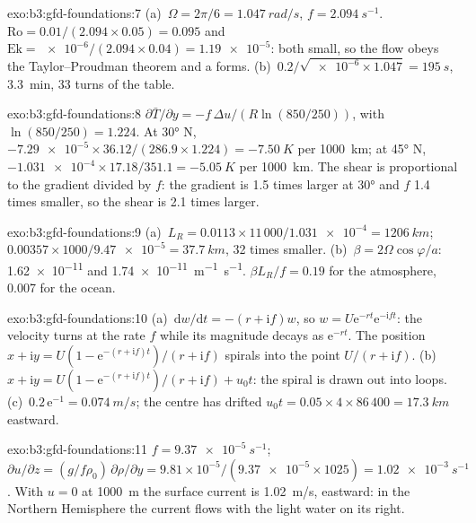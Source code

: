\begin{solution}{exo:b3:gfd-foundations:7}
(a)~$\Omega = 2\pi/6 = \qty{1.047}{rad/s}$, $f = \qty{2.094}{s^{-1}}$.
$\mathrm{Ro} = 0.01/(2.094\times0.05) = 0.095$ and $\mathrm{Ek} =
\num{e-6}/(2.094\times0.04) = \num{1.19e-5}$: both small, so the flow obeys
the Taylor--Proudman theorem and a  forms. (b)~$0.2/\sqrt{\num{e-6}
\times1.047} = \qty{195}{s}$, \qty{3.3}{min}, 33 turns of the table.
\end{solution}

\begin{solution}{exo:b3:gfd-foundations:8}
$\partial\bar T/\partial y = -f\,\Delta u/(R\ln(850/250))$, with
$\ln(850/250) = 1.224$. At \ang{30} N, $-\num{7.29e-5}\times36.12/(286.9
\times1.224) = \qty{-7.50}{K}$ per \qty{1000}{km}; at \ang{45} N,
$-\num{1.031e-4}\times17.18/351.1 = \qty{-5.05}{K}$ per \qty{1000}{km}. The
shear is proportional to the gradient divided by $f$: the gradient is 1.5
times larger at \ang{30} and $f$ 1.4 times smaller, so the shear is 2.1 times
larger.
\end{solution}

\begin{solution}{exo:b3:gfd-foundations:9}
(a)~$L_R = 0.0113\times11\,000/\num{1.031e-4} = \qty{1206}{km}$;
$0.00357\times1000/\num{9.47e-5} = \qty{37.7}{km}$, 32 times smaller.
(b)~$\beta = 2\Omega\cos\varphi/a$: \num{1.62e-11} and
\qty{1.74e-11}{m^{-1}.s^{-1}}. $\beta L_R/f = 0.19$ for the atmosphere, 0.007
for the ocean.
\end{solution}

\begin{solution}{exo:b3:gfd-foundations:10}
(a)~$\mathrm dw/\mathrm dt = -(r + \mathrm if)w$, so $w = U\mathrm
e^{-rt}\mathrm e^{-\mathrm ift}$: the velocity turns at the rate $f$ while
its magnitude decays as $\mathrm e^{-rt}$. The position $x + \mathrm iy =
U(1 - \mathrm e^{-(r + \mathrm if)t})/(r + \mathrm if)$ spirals into the
point $U/(r + \mathrm if)$. (b)~$x + \mathrm iy = U(1 - \mathrm e^{-(r +
\mathrm if)t})/(r + \mathrm if) + u_0t$: the spiral is drawn out into loops.
(c)~$0.2\,\mathrm e^{-1} = \qty{0.074}{m/s}$; the centre has drifted $u_0t =
0.05\times4\times86\,400 = \qty{17.3}{km}$ eastward.
\end{solution}

\begin{solution}{exo:b3:gfd-foundations:11}
$f = \qty{9.37e-5}{s^{-1}}$; $\partial u/\partial z = (g/f\rho_0)\,\partial
\rho/\partial y = 9.81\times10^{-5}/(\num{9.37e-5}\times1025) =
\qty{1.02e-3}{s^{-1}}$. With $u = 0$ at \qty{1000}{m} the surface current is
\qty{1.02}{m/s}, eastward: in the Northern Hemisphere the current flows with
the light water on its right.
\end{solution}


